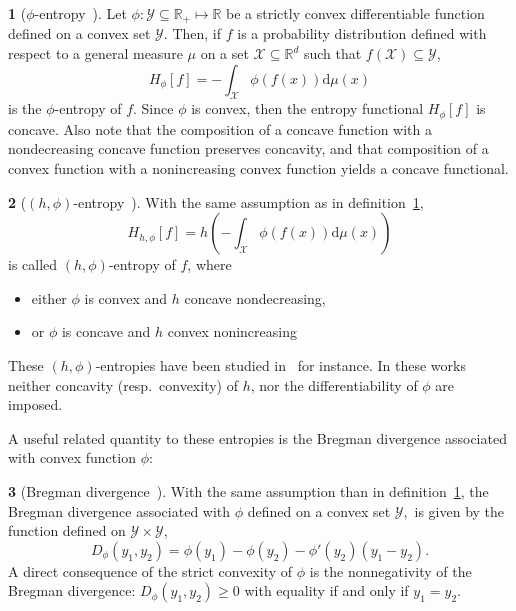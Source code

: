\documentclass[english,sort&compress]{elsarticle}
\theoremstyle{definition}
\newtheorem{defn}{\protect\definitionname}
\theoremstyle{plain}
\theoremstyle{plain}
\providecommand{\definitionname}{Definition}
\def\dmu{\mathrm{d}\mu}
\def\Rset{\mathbb{R}}
\def\X{\mathcal{X}}
\def\Y{\mathcal{Y}}
\begin{document}
\begin{defn}[$\phi$-entropy~\cite{Csi67, SalMen93, Sal94}]
\label{def:phi-entropy}
Let  $\phi:   \Y  \subseteq  \Rset_+   \mapsto  \Rset$  be  a   strictly  convex
differentiable function defined on a convex set $\Y$.  Then, if $f$ is
a probability distribution defined with respect  to a general measure $\mu$ on a
set $\X \subseteq \Rset^d$ such that $f(\X) \subseteq \Y$,
  \begin{equation}\label{eq:phi-entropy}
    H_\phi[f] = - \int_\X \phi(f(x)) \dmu(x)
  \end{equation}
  is  the $\phi$-entropy  of  $f$.  Since  $\phi$  is convex,  then the  entropy
  functional  $H_\phi[f]$ is  concave.   Also  note that  the  composition of  a
  concave function  with a  nondecreasing concave function  preserves concavity,
  and that composition of a convex function with a nonincreasing convex function
  yields a concave functional.
\end{defn}

\begin{defn}[$(h,\phi)$-entropy~\cite{Csi67, SalMen93, Sal94}]
\label{def:h_phi-entropy}
  With the same assumption as in definition~\ref{def:phi-entropy},
  \begin{equation}\label{eq:h-phi-entropy}
    H_{h,\phi}[f] = h\left( - \int_\X \phi(f(x)) \dmu(x) \right)
  \end{equation}
  is called $(h,\phi)$-entropy of $f$, where
  \begin{itemize}
  \item either $\phi$ is convex and $h$ concave nondecreasing,
  \item or $\phi$ is concave and $h$ convex nonincreasing
  \end{itemize}
\end{defn}
%
These $(h,\phi)$-entropies have been studied in~\cite{SalMen93, Sal94, MenMor97}
for instance.  In  these works neither concavity (resp.\  convexity) of $h$, nor
the differentiability of $\phi$ are imposed.

A  useful  related  quantity  to  these  entropies  is  the  Bregman  divergence
associated with convex function $\phi$:
%
\begin{defn}[Bregman divergence~\cite{Bre67, Bas13}]
\label{def:Bregman}
  With the same assumption than in definition~\ref{def:phi-entropy}, the Bregman
  divergence  associated with $\phi$  defined on  a  convex set  $\Y,$ is
  given by the function defined on $\Y \times \Y$,
  \begin{equation}\label{eq:Bregman}
    D_\phi(y_1,y_2) = \phi(y_1) - \phi(y_2) - \phi'(y_2) \left(y_1-y_2\right).
  \end{equation}
  A direct consequence of the strict convexity of $\phi$ is the nonnegativity of
  the Bregman divergence:  $D_\phi(y_1,y_2) \ge 0$ with equality  if and only if
  $y_1 = y_2$.
\end{defn}
\end{document}
